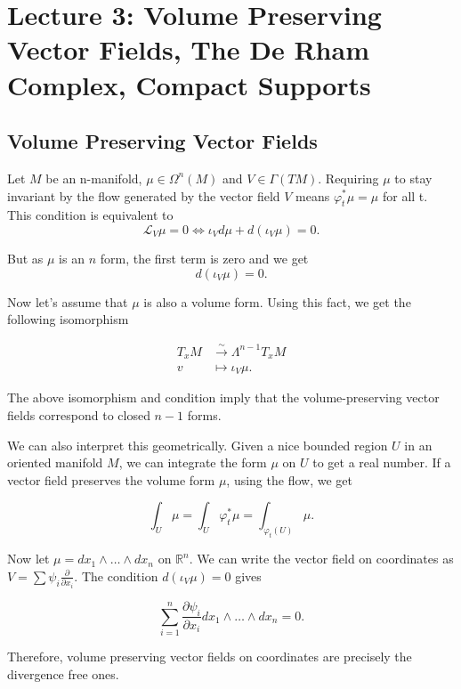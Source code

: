 \documentclass[12pt]{amsart}
\theoremstyle{remark}
\begin{document}
\section{Lecture 3: Volume Preserving Vector Fields, The De Rham Complex, Compact Supports}

\subsection{Volume Preserving Vector Fields}

Let $M$ be an n-manifold, $\mu \in \Omega^n(M)$ and $V\in \Gamma(TM)$. Requiring $\mu$ to stay invariant by the flow generated by the vector field $V$ means $\varphi_t^*\mu = \mu$ for all t. This condition is equivalent to $$\mathcal{L}_V\mu = 0 \iff \iota_Vd\mu + d(\iota_V\mu)=0.$$

But as $\mu$ is an $n$ form, the first term is zero and we get $$d(\iota_V\mu)=0.$$

Now let's assume that $\mu$ is also a volume form. Using this fact, we get the following isomorphism

\begin{align*}
        T_xM &\xrightarrow{\sim} \Lambda^{n-1}T_xM \\ v &\mapsto \iota_V\mu.     
\end{align*}

The above isomorphism and condition imply that the volume-preserving vector fields correspond to closed $n-1$ forms.

We can also interpret this geometrically. Given a nice bounded region $U$ in an oriented manifold $M$, we can integrate the form $\mu$ on $U$ to get a real number. If a vector field preserves the volume form $\mu$, using the flow, we get

\begin{equation*}
    \int_U \mu = \int_U \varphi_t^*\mu= \int_{\varphi_t(U)} \mu .
\end{equation*}

Now let $\mu= dx_1\wedge\dots\wedge dx_n$ on $\mathbb{R}^n$. We can write the vector field on coordinates as $V=\sum\psi_i \frac{\partial}{\partial x_i}$. The condition $d(\iota_V\mu)=0$ gives

\begin{equation*}
    \sum_{i=1}^n \frac{\partial \psi_i}{\partial x_i}dx_1\wedge\dots\wedge dx_n=0.
\end{equation*}

Therefore, volume preserving vector fields on coordinates are precisely the divergence free ones.
\end{document}
